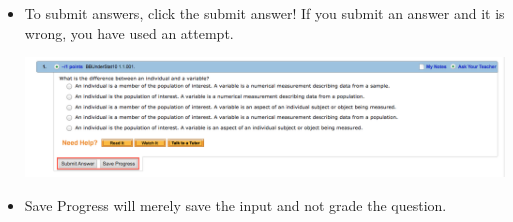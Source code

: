 \documentclass{article}
\begin{document}
\begin{itemize}
\item To submit answers, click the submit answer! If you submit an answer and it is wrong, you have used an attempt.

\begin{center}
\includegraphics[scale=0.25]{problem-answers.png}
\end{center}

\item Save Progress will merely save the input and not grade the question.
\end{itemize}
\end{document}
